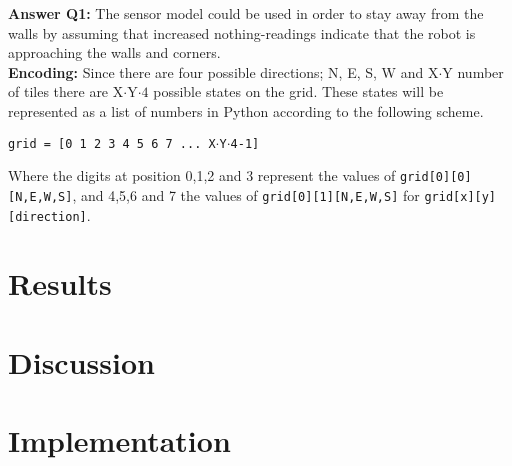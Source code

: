 \documentclass{article}
\begin{document}
    \textbf{Answer Q1:} The sensor model could be used in order to stay away
    from the walls by assuming that increased nothing-readings indicate that
    the robot is approaching the walls and corners. \\

    \textbf{Encoding:} Since there are four possible directions; N, E, S, W
    and X$\cdot$Y number of tiles there are X${\cdot}$Y${\cdot}4$ possible
    states on the grid. These states will be represented as a list of numbers
    in Python according to the following scheme.

    \begin{center}
      \texttt{grid = [0 1 2 3 4 5 6 7 ...\ X$\cdot$Y$\cdot$4-1] }
    \end{center}

    Where the digits at position 0,1,2 and 3 represent the values of
    \texttt{grid[0][0][N,E,W,S]}, and 4,5,6 and 7 the values of
    \texttt{grid[0][1][N,E,W,S]} for \texttt{grid[x][y][direction]}.


  \section*{Results}
  \section*{Discussion}
  \section*{Implementation}
\end{document}

